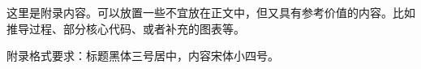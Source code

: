 
\begin{appendix}
这里是附录内容。可以放置一些不宜放在正文中，但又具有参考价值的内容。比如推导过程、部分核心代码、或者补充的图表等。

附录格式要求：标题黑体三号居中，内容宋体小四号。
\end{appendix}
